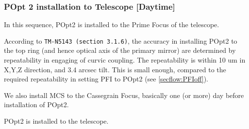 \subsubsection{POpt 2 installation to Telescope [Daytime]}\label{secflow:PFIinstall}
In this sequence,  POpt2 is installed to the Prime Focus of the telescope.

According to {\tt TM-N5143 (section 3.1.6)}, the accuracy in installing POpt2 to the top ring (and hence optical axis of the primary mirror) are determined by repeatability in engaging of curvic coupling.
The repeatability is within 10 um in X,Y,Z direction, and 3.4 arcsec tilt.
This is small enough, compared to the required repeatability in setting PFI to POpt2 (see \ref{secflow:PFIoff}).

We also install MCS to the Cassegrain Focus, basically one (or more) day before installation of POpt2.

\begin{itembox}[l]{}
POpt2 is installed to the telescope. 

\end{itembox}
